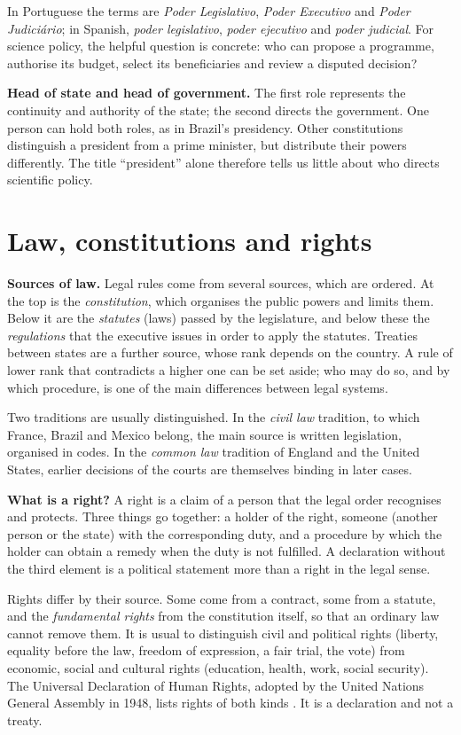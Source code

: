 In Portuguese the terms are \emph{Poder
Legislativo},
\emph{Poder Executivo} and \emph{Poder
Judiciário};
in Spanish, \emph{poder legislativo},
\emph{poder ejecutivo} and \emph{poder
judicial}.
For science policy, the helpful question is
concrete:
who can propose a programme, authorise its
budget,
select its beneficiaries and review a
disputed decision?

\textbf{Head of state and head of
government.}
The first role represents the continuity and
authority
of the state; the second directs the
government.
One person can hold both roles, as in
Brazil's presidency.
Other constitutions distinguish a president
from a prime
minister, but distribute their powers
differently.
The title ``president'' alone therefore tells
us little
about who directs scientific policy.

\section{Law, constitutions and rights}
\label{section-gsf-law-rights}

\textbf{Sources of law.}
Legal rules come from several sources, which
are ordered. At the top is the
\emph{constitution}, which organises the
public powers and limits them. Below it are
the \emph{statutes} (laws) passed by the
legislature, and below these the
\emph{regulations} that the executive issues
in order to apply the statutes. Treaties
between states are a further source, whose
rank depends on the country. A rule of lower
rank that contradicts a higher one can be set
aside; who may do so, and by which procedure,
is one of the main differences between legal
systems.

Two traditions are usually distinguished. In
the \emph{civil law} tradition, to which
France, Brazil and Mexico belong, the main
source is written legislation, organised in
codes. In the \emph{common law} tradition of
England and the United States, earlier
decisions of the courts are themselves
binding in later cases.

\textbf{What is a right?}
A right is a claim of a person that the legal
order recognises and protects. Three things
go together: a holder of the right, someone
(another person or the state) with the
corresponding duty, and a procedure by which
the holder can obtain a remedy when the duty
is not fulfilled. A declaration without the
third element is a political statement more
than a right in the legal sense.

Rights differ by their source. Some come from
a contract, some from a statute, and the
\emph{fundamental rights} from the
constitution itself, so that an ordinary law
cannot remove them. It is usual to
distinguish civil and political rights
(liberty, equality before the law, freedom of
expression, a fair trial, the vote) from
economic, social and cultural rights
(education, health, work, social security).
The Universal Declaration of Human Rights,
adopted by the United Nations General
Assembly in 1948, lists rights of both kinds
\cite{gsf-udhr}. It is a declaration and not
a treaty.


